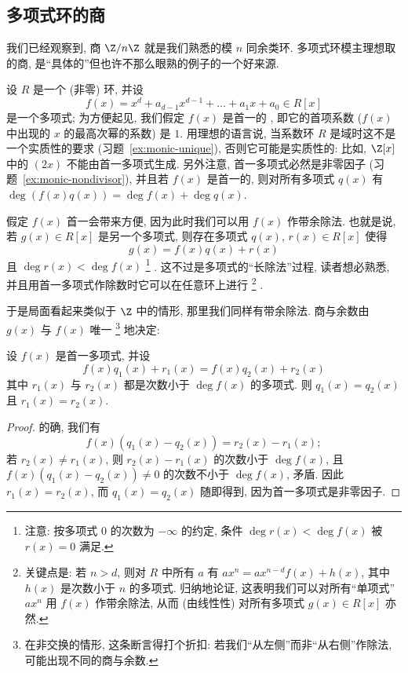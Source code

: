 \subsection{多项式环的商}
\label{subsec:poly-quotients}

我们已经观察到, 商 $\Z/n\Z$ 就是我们熟悉的模 $n$ 同余类环. 多项式环模主理想取的商, 是``具体的''但也许不那么眼熟的例子的一个好来源.

设 $R$ 是一个 (非零) 环, 并设
\[
f(x) = x^d + a_{d-1}x^{d-1} + \dots + a_1 x + a_0 \in R[x]
\]
是一个多项式; 为方便起见, 我们假定 $f(x)$ 是首一的%
, 即它的首项系数 ($f(x)$ 中出现的 $x$ 的最高次幂的系数) 是 $1$. 用理想的语言说, 当系数环 $R$ 是域时这不是一个实质性的要求 (习题~\ref{ex:monic-unique}), 否则它可能是实质性的: 比如, $\Z[x]$ 中的 $(2x)$ 不能由首一多项式生成. 另外注意, 首一多项式必然是非零因子 (习题~\ref{ex:monic-nondivisor}), 并且若 $f(x)$ 是首一的, 则对所有多项式 $q(x)$ 有 $\deg(f(x)q(x)) = \deg f(x) + \deg q(x)$.

假定 $f(x)$ 首一会带来方便, 因为此时我们可以用 $f(x)$ 作带余除法. 也就是说, 若 $g(x) \in R[x]$ 是另一个多项式, 则存在多项式 $q(x)$, $r(x) \in R[x]$ 使得
\[
g(x) = f(x)q(x) + r(x)
\]
且 $\deg r(x) < \deg f(x)$%
\footnote{注意: 按多项式 $0$ 的次数为 $-\infty$ 的约定, 条件 $\deg r(x) < \deg f(x)$ 被 $r(x) = 0$ 满足.}%
. 这不过是多项式的``长除法''过程, 读者想必熟悉, 并且用首一多项式作除数时它可以在任意环上进行%
\footnote{关键点是: 若 $n > d$, 则对 $R$ 中所有 $a$ 有 $ax^n = ax^{n-d}f(x) + h(x)$, 其中 $h(x)$ 是次数小于 $n$ 的多项式. 归纳地论证, 这表明我们可以对所有``单项式''$ax^n$ 用 $f(x)$ 作带余除法, 从而 (由线性性) 对所有多项式 $g(x) \in R[x]$ 亦然.}%
.

于是局面看起来类似于 $\Z$ 中的情形, 那里我们同样有带余除法. 商与余数由 $g(x)$ 与 $f(x)$ 唯一%
\footnote{在非交换的情形, 这条断言得打个折扣: 若我们``从左侧''而非``从右侧''作除法, 可能出现不同的商与余数.}%
地决定:

\begin{lemma}
\label{lem:division-unique}
设 $f(x)$ 是首一多项式, 并设
\[
f(x)q_1(x) + r_1(x) = f(x)q_2(x) + r_2(x)
\]
其中 $r_1(x)$ 与 $r_2(x)$ 都是次数小于 $\deg f(x)$ 的多项式. 则 $q_1(x) = q_2(x)$ 且 $r_1(x) = r_2(x)$.
\end{lemma}

\begin{proof}
的确, 我们有
\[
f(x)(q_1(x) - q_2(x)) = r_2(x) - r_1(x);
\]
若 $r_2(x) \neq r_1(x)$, 则 $r_2(x) - r_1(x)$ 的次数小于 $\deg f(x)$, 且 $f(x)(q_1(x) - q_2(x)) \neq 0$ 的次数不小于 $\deg f(x)$, 矛盾. 因此 $r_1(x) = r_2(x)$, 而 $q_1(x) = q_2(x)$ 随即得到, 因为首一多项式是非零因子.
\end{proof}

